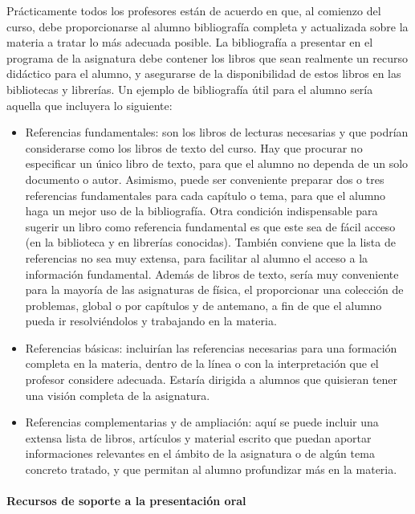 Prácticamente todos los profesores están de acuerdo en que, al comienzo del curso, debe proporcionarse al alumno bibliografía completa y actualizada sobre la materia a tratar lo más adecuada posible. La bibliografía a presentar en el programa de la asignatura debe contener los libros que sean realmente un recurso didáctico para el alumno, y asegurarse de la disponibilidad de estos libros en las bibliotecas y librerías. Un ejemplo de bibliografía útil para el alumno sería aquella que incluyera lo siguiente:
\begin{itemize}
\item	Referencias fundamentales: son los libros de lecturas necesarias y que podrían considerarse como los libros de texto del curso. Hay que procurar no especificar un único libro de texto, para que el alumno no dependa de un solo documento o autor. Asimismo, puede ser conveniente preparar dos o tres referencias fundamentales para cada capítulo o tema, para que el alumno haga un mejor uso de la bibliografía. Otra condición indispensable para sugerir un libro como referencia fundamental es que este sea de fácil acceso (en la biblioteca y en librerías conocidas). También conviene que la lista de referencias no sea muy extensa, para facilitar al alumno el acceso a la información fundamental. Además de libros de texto, sería muy conveniente para la mayoría de las asignaturas de física, el proporcionar una colección de problemas, global o por capítulos y de antemano, a fin de que el alumno pueda ir resolviéndolos y trabajando en la materia.
\item	Referencias básicas: incluirían las referencias necesarias para una formación completa en la materia, dentro de la línea o con la interpretación que el profesor considere adecuada. Estaría dirigida a alumnos que quisieran tener una visión completa de la asignatura.
\item	Referencias complementarias y de ampliación: aquí se puede incluir una extensa lista de libros, artículos y material escrito que puedan aportar informaciones relevantes en el ámbito de la asignatura o de algún tema concreto tratado, y que permitan al alumno profundizar más en la materia.
\end{itemize}

\paragraph{Recursos de soporte a la presentación oral\\\\}

